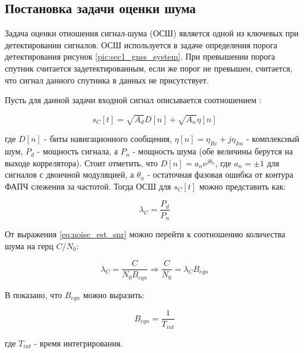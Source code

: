 \subsection{Постановка задачи оценки шума}
\label{sec1_noise_est}

Задача оценки отношения сигнал-шума (ОСШ) является одной из ключевых при детектировании сигналов.
ОСШ используется в задаче определения порога детектирования рисунок \ref{pic:sec1_gnss_system}.
При превышении порога спутник считается задетектированным, если же порог
не превышен, считается, что сигнал данного спутника в данных не присутствует.

Пусть для данной задачи входной сигнал описывается соотношением \cite{presti_ieee}:
\begin{center}
\begin{equation}
	\label{eq:noise_est_signal}
	s_C[t]=\sqrt{A_d}D[n] + \sqrt{A_n}\eta[n]
\end{equation}
\end{center}
где $D[n]$ - биты навигационного сообщения, $\eta[n]=\eta_{Re} + j\eta_{Im}$ - комплексный шум,
$P_d$ - мощность сигнала, а $P_n$ - мощность шума (обе величины берутся на выходе коррелятора).
Стоит отметить, что $D[n]=a_{n}e^{j\theta_n}$, где $a_n=\pm{1}$ для сигналов с двоичной модуляцией, а
$\theta_n$ - остаточная фазовая ошибка от контура ФАПЧ слежения за частотой.
Тогда ОСШ для $s_C[t]$ можно представить как:
\begin{center}
\begin{equation}
	\label{eq:noise_est_snr}
	\lambda_C=\frac{P_d}{P_n}
\end{equation}
\end{center}
От выражения \ref{eq:noise_est_snr} можно перейти к соотношению количества шума на герц $C/N_0$:
\begin{center}
\begin{equation}
	\label{eq:noise_est_cn}
	\lambda_C=\frac{C}{N_{0}B_{eqn}}\Rightarrow\frac{C}{N_0}=\lambda_{C}B_{eqn}
\end{equation}
\end{center}
В \cite{presti_ieee} показано, что $B_{eqn}$ можно выразить:
\begin{center}
\begin{equation}
	\label{eq:noise_est_beqn}
	B_{eqn}=\frac{1}{T_{int}}
\end{equation}
\end{center}
где ${T_{int}}$ - время интегрирования.


\newpage
